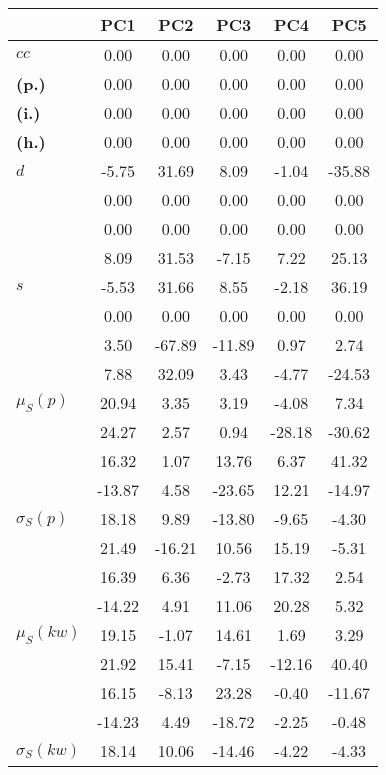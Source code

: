 \begin{table}[h!]
\begin{center}
\begin{tabular}{| l || c | c | c | c | c |}\hline
 & {\bf PC1} & {\bf PC2} & {\bf PC3} & {\bf PC4} & {\bf PC5} \\\hline\hline
{\bf $cc$} & 0.00 & 0.00 & 0.00 & 0.00 & 0.00 \\
{\bf (p.)} & 0.00 & 0.00 & 0.00 & 0.00 & 0.00 \\
{\bf (i.)} & 0.00 & 0.00 & 0.00 & 0.00 & 0.00 \\
{\bf (h.)} & 0.00 & 0.00 & 0.00 & 0.00 & 0.00 \\\hline
{\bf $d$} & -5.75 & 31.69 & 8.09 & -1.04 & -35.88 \\
 & 0.00  & 0.00  & 0.00  & 0.00  & 0.00 \\\hline
 & 0.00  & 0.00  & 0.00  & 0.00  & 0.00 \\\hline
{\bf } & 8.09 & 31.53 & -7.15 & 7.22 & 25.13 \\\hline
{\bf $s$} & -5.53 & 31.66 & 8.55 & -2.18 & 36.19 \\
 & 0.00  & 0.00  & 0.00  & 0.00  & 0.00 \\\hline
 & 3.50  & -67.89  & -11.89  & 0.97  & 2.74 \\
 & 7.88  & 32.09  & 3.43  & -4.77  & -24.53 \\\hline
$\mu_S(p)$ & 20.94  & 3.35  & 3.19  & -4.08  & 7.34 \\
 & 24.27  & 2.57  & 0.94  & -28.18  & -30.62 \\
 & 16.32  & 1.07  & 13.76  & 6.37  & 41.32 \\
 & -13.87  & 4.58  & -23.65  & 12.21  & -14.97 \\\hline
$\sigma_S(p)$ & 18.18  & 9.89  & -13.80  & -9.65  & -4.30 \\
 & 21.49  & -16.21  & 10.56  & 15.19  & -5.31 \\
 & 16.39  & 6.36  & -2.73  & 17.32  & 2.54 \\
 & -14.22  & 4.91  & 11.06  & 20.28  & 5.32 \\\hline
$\mu_S(kw)$ & 19.15  & -1.07  & 14.61  & 1.69  & 3.29 \\
 & 21.92  & 15.41  & -7.15  & -12.16  & 40.40 \\
 & 16.15  & -8.13  & 23.28  & -0.40  & -11.67 \\
 & -14.23  & 4.49  & -18.72  & -2.25  & -0.48 \\\hline
$\sigma_S(kw)$ & 18.14  & 10.06  & -14.46  & -4.22  & -4.33 \\

\end{tabular}
\end{center}
\end{table}
